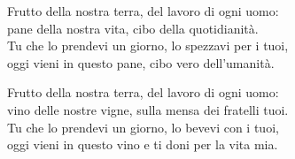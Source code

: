 
\strofa Frutto della nostra terra, del lavoro di ogni uomo:\\
pane della nostra vita, cibo della quotidianità.\\
Tu che lo prendevi un giorno, lo spezzavi per i tuoi,\\
oggi vieni in questo pane, cibo vero dell'umanità.

\spazio


\spazio

\strofa Frutto della nostra terra, del lavoro di ogni uomo:\\
vino delle nostre vigne, sulla mensa dei fratelli tuoi.\\
Tu che lo prendevi un giorno, lo bevevi con i tuoi,\\
oggi vieni in questo vino e ti doni per la vita mia.

\spazio

